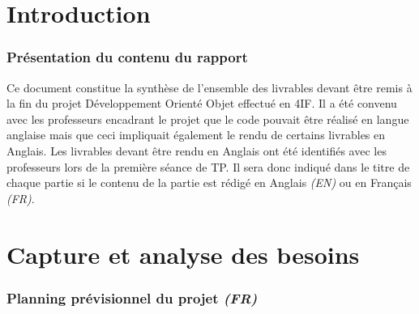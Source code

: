 \documentclass[paper=a4, fontsize=11pt]{report}
\numberwithin{equation}{section}		%
\numberwithin{figure}{section}		%
\numberwithin{table}{section}		%
\renewcommand{\it}[1]{\textit{#1}}
\begin{document}


\tableofcontents

\listoftodos

\newpage

\part{Introduction}
\label{part:introduction}

\section{Présentation du contenu du rapport}
\label{sec:presentation-du-contenu-du-rapport}

Ce document constitue la synthèse de l'ensemble des livrables devant être remis à la fin du projet Développement Orienté Objet effectué en 4IF. Il a été convenu avec les professeurs encadrant le projet que le code pouvait être réalisé en langue anglaise mais que ceci impliquait également le rendu de certains livrables en Anglais. Les livrables devant être rendu en Anglais ont été identifiés avec les professeurs lors de la première séance de TP. Il sera donc indiqué dans le titre de chaque partie si le contenu de la partie est rédigé en Anglais \it{(EN)} ou en Français \it{(FR)}.  


\part{Capture et analyse des besoins}
\label{part:capture-et-analyse-des-besoins}

\section{Planning prévisionnel du projet \it{(FR)}}
\label{sec:planning-previsionnel-du-projet}
\end{document}

